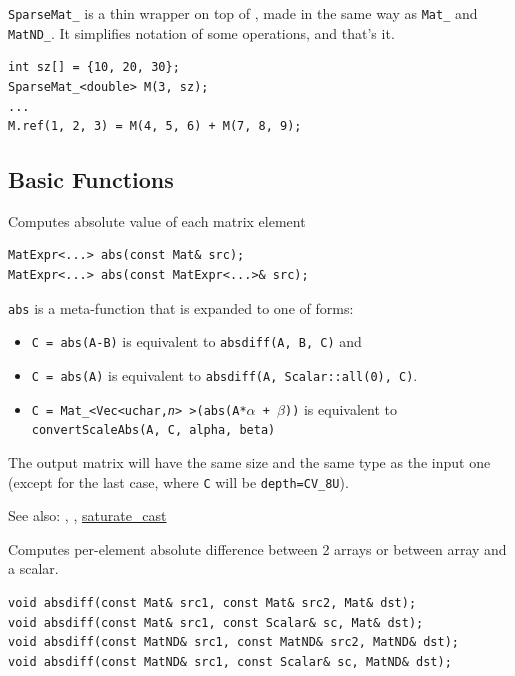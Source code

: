 \texttt{SparseMat\_} is a thin wrapper on top of , made in the same way as \texttt{Mat\_} and \texttt{MatND\_}.
It simplifies notation of some operations, and that's it.
\begin{lstlisting}
int sz[] = {10, 20, 30};
SparseMat_<double> M(3, sz);
...
M.ref(1, 2, 3) = M(4, 5, 6) + M(7, 8, 9);
\end{lstlisting}

\subsection{Basic Functions}

\label{abs}
Computes absolute value of each matrix element

\begin{lstlisting}
MatExpr<...> abs(const Mat& src);
MatExpr<...> abs(const MatExpr<...>& src);
\end{lstlisting}
\begin{description}
\end{description}

\texttt{abs} is a meta-function that is expanded to one of  forms:

\begin{itemize}
    \item \texttt{C = abs(A-B)} is equivalent to \texttt{absdiff(A, B, C)} and
    \item \texttt{C = abs(A)} is equivalent to \texttt{absdiff(A, Scalar::all(0), C)}.
    \item \texttt{C = Mat\_<Vec<uchar,\emph{n}> >(abs(A*$\alpha$ + $\beta$))} is equivalent to \texttt{convertScaleAbs(A, C, alpha, beta)}
\end{itemize}

The output matrix will have the same size and the same type as the input one
(except for the last case, where \texttt{C} will be \texttt{depth=CV\_8U}).

See also: , , \hyperref[saturatecast]{saturate\_cast}

\label{absdiff}
Computes per-element absolute difference between 2 arrays or between array and a scalar.

\begin{lstlisting}
void absdiff(const Mat& src1, const Mat& src2, Mat& dst);
void absdiff(const Mat& src1, const Scalar& sc, Mat& dst);
void absdiff(const MatND& src1, const MatND& src2, MatND& dst);
void absdiff(const MatND& src1, const Scalar& sc, MatND& dst);
\end{lstlisting}
\begin{description}
\end{description}

